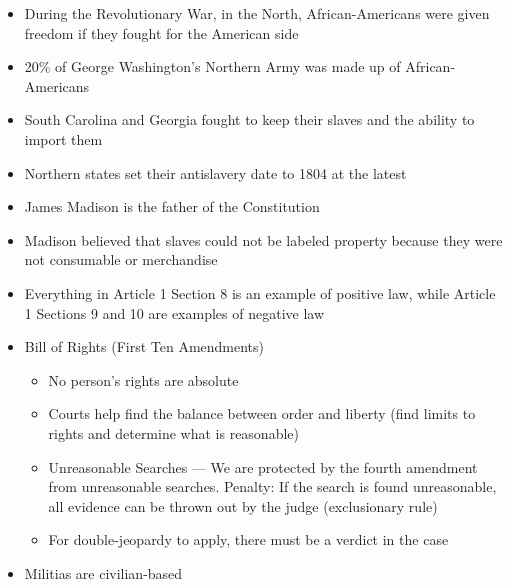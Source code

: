 \documentclass[12pt]{article}
\begin{document}
\begin{itemize}
  \item During the Revolutionary War, in the North, African-Americans were given freedom if they fought for the American side

  \item 20\% of George Washington's Northern Army was made up of African-Americans

  \item South Carolina and Georgia fought to keep their slaves and the ability to import them

  \item Northern states set their antislavery date to 1804 at the latest

  \item James Madison is the father of the Constitution

  \item Madison believed that slaves could not be labeled property because they were not consumable or merchandise

  \item Everything in Article 1 Section 8 is an example of positive law, while Article 1 Sections 9 and 10 are examples of negative law

  \item Bill of Rights (First Ten Amendments)

    \begin{itemize}

      \item No person's rights are absolute

      \item Courts help find the balance between order and liberty (find limits to rights and determine what is reasonable)

      \item Unreasonable Searches — We are protected by the fourth amendment from unreasonable searches. Penalty: If the search is found unreasonable, all evidence can be thrown out by the judge (exclusionary rule)

      \item For double-jeopardy to apply, there must be a verdict in the case

    \end{itemize}

  \item Militias are civilian-based

     
\end{itemize}
\end{document}
